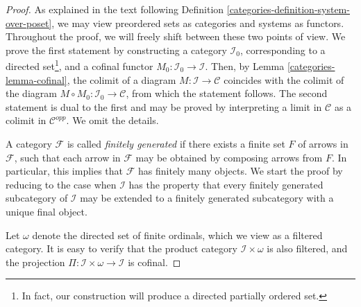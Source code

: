 \begin{proof}

As explained in the text following
Definition \ref{categories-definition-system-over-poset}, we may view
preordered sets as categories and systems as functors.
Throughout the proof, we will freely shift between these two points of view.
We prove the first statement by constructing a category
$\mathcal{I}_0$, corresponding to a directed set\footnote{In fact,
our construction will produce a directed partially ordered set.}, and a cofinal
functor $M_0 : \mathcal{I}_0 \to \mathcal{I}$. Then, by
Lemma \ref{categories-lemma-cofinal}, the colimit of a diagram
$M : \mathcal{I} \to \mathcal{C}$ coincides with the
colimit of the diagram $M \circ M_0 : \mathcal{I}_0 \to \mathcal{C}$,
from which the statement follows. The second statement is dual to the
first and may be proved by interpreting a limit in $\mathcal{C}$ as
a colimit in $\mathcal{C}^{opp}$. We omit the details.

\medskip\noindent
A category $\mathcal{F}$ is called {\em finitely generated} if
there exists a finite set $F$ of arrows in $\mathcal{F}$, such that
each arrow in $\mathcal{F}$ may be obtained by composing
arrows from $F$. In particular, this implies that $\mathcal{F}$ has
finitely many objects. We start the proof by reducing to the case
when $\mathcal{I}$ has the property that every finitely generated
subcategory of $\mathcal{I}$ may be extended to a finitely
generated subcategory with a unique final object.

\medskip\noindent
Let $\omega$ denote the directed set of finite ordinals, which
we view as a filtered category. It is easy to verify that the
product category $\mathcal{I}\times \omega$ is also filtered,
and the projection
$\Pi : \mathcal{I} \times \omega \to \mathcal{I}$
is cofinal.


\end{proof}
